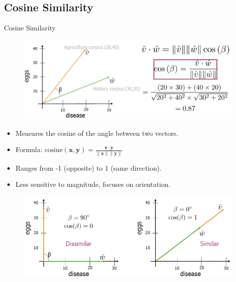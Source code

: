\subsection{Cosine Similarity}
\begin{frame}[allowframebreaks]{Cosine Similarity}
    \begin{figure}
        \centering
        \includegraphics[width=\textwidth,height=0.65\textheight,keepaspectratio]{images/vector-space/cosine-similarity-1.png}
    \end{figure}
    \begin{itemize}
        \item Measures the cosine of the angle between two vectors.
        \item Formula: $\text{cosine}(\mathbf{x}, \mathbf{y}) = \frac{\mathbf{x} \cdot \mathbf{y}}{\|\mathbf{x}\| \|\mathbf{y}\|}$
        \item Ranges from -1 (opposite) to 1 (same direction).
        \item Less sensitive to magnitude, focuses on orientation.
    \end{itemize}
\framebreak
    \begin{figure}
        \centering
        \includegraphics[width=\textwidth,height=0.8\textheight,keepaspectratio]{images/vector-space/cosine-similarity-2.png}
    \end{figure}
\end{frame}

